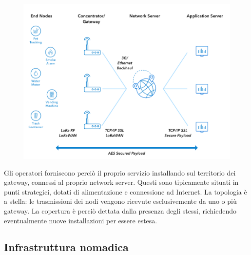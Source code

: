 \documentclass[a4paper,12pt]{article}
\theoremstyle{definition}
\begin{document}

\begin{figure}[H]
\centering
\includegraphics[width=4.5in]{figures/lorawan.png}
\caption{}
\end{figure}

Gli operatori forniscono perciò il proprio servizio installando sul territorio dei gateway, connessi al proprio network server. Questi sono tipicamente situati in punti strategici, dotati di alimentazione e connessione ad Internet. La topologia è a stella: le trasmissioni dei nodi vengono ricevute esclusivemente da uno o più gateway. La copertura è perciò dettata dalla presenza degli stessi, richiedendo eventualmente nuove installazioni per essere estesa.

\subsection{Infrastruttura nomadica}


\end{document}
